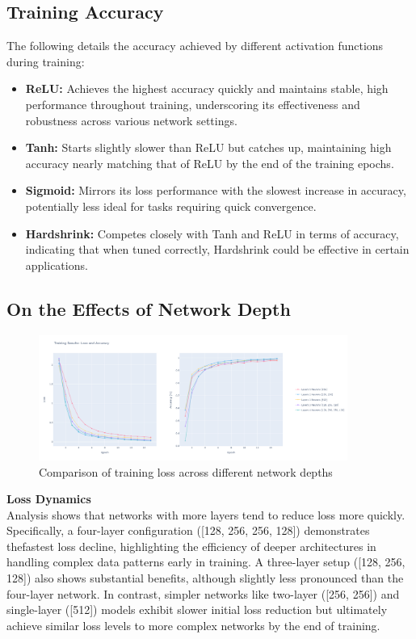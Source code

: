\documentclass[11pt,a4paper]{article}
\begin{document}
\newpage

\subsection*{Training Accuracy}
The following details the accuracy achieved by different activation functions during training:

\begin{itemize}
    \item \textbf{ReLU:} Achieves the highest accuracy quickly and maintains stable, high performance throughout training, underscoring its effectiveness and robustness across various network settings.
    \item \textbf{Tanh:} Starts slightly slower than ReLU but catches up, maintaining high accuracy nearly matching that of ReLU by the end of the training epochs.
    \item \textbf{Sigmoid:} Mirrors its loss performance with the slowest increase in accuracy, potentially less ideal for tasks requiring quick convergence.
    \item \textbf{Hardshrink:} Competes closely with Tanh and ReLU in terms of accuracy, indicating that when tuned correctly, Hardshrink could be effective in certain applications.
\end{itemize}

\subsection{On the Effects of Network Depth}

\begin{figure}[ht]
    \centering
    \includegraphics[width=0.9\textwidth]{images/layer_loss.png}
    \caption{Comparison of training loss across different network depths}
    \label{fig:layer_loss}
\end{figure}

\noindent \textbf{Loss Dynamics} \\
Analysis shows that networks with more layers tend to reduce loss more quickly. Specifically, a four-layer configuration ([128, 256, 256, 128])
demonstrates thefastest loss decline, highlighting the efficiency of deeper architectures in handling complex data patterns early in training.
A three-layer setup ([128, 256, 128]) also shows substantial benefits, although slightly less pronounced than the four-layer network.
In contrast, simpler networks like two-layer ([256, 256]) and single-layer ([512]) models exhibit slower initial loss reduction but
ultimately achieve similar loss levels to more complex networks by the end of training.
\vspace*{11pt}
\end{document}
